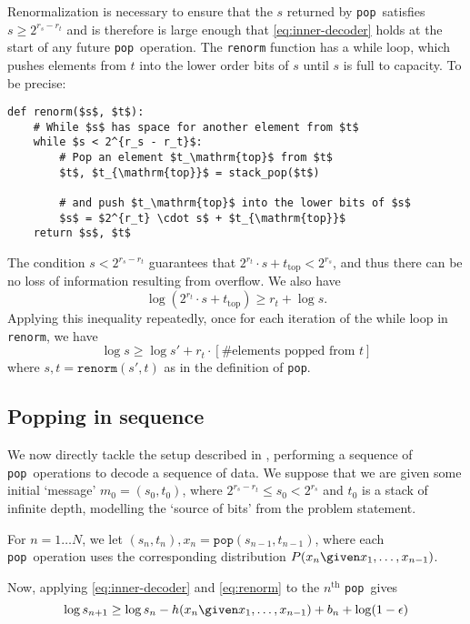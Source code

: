 \documentclass{article}
\newcommand{\pop}{\texttt{pop}}
\begin{document}
Renormalization is necessary to ensure that the \(s\) returned by \pop\
satisfies \(s\geq2^{r_s - r_t}\) and is therefore is large enough that
\cref{eq:inner-decoder} holds at the start of any future \pop\ operation. The
\texttt{renorm} function has a while loop, which pushes elements from \(t\)
into the lower order bits of \(s\) until \(s\) is full to capacity. To be
precise:

\begin{lstlisting}
def renorm($s$, $t$):
    # While $s$ has space for another element from $t$
    while $s < 2^{r_s - r_t}$:
        # Pop an element $t_\mathrm{top}$ from $t$
        $t$, $t_{\mathrm{top}}$ = stack_pop($t$)

        # and push $t_\mathrm{top}$ into the lower bits of $s$
        $s$ = $2^{r_t} \cdot s$ + $t_{\mathrm{top}}$
    return $s$, $t$
\end{lstlisting}

The condition \(s < 2^{r_s - r_t}\) guarantees that \(2^{r_t} \cdot s +
t_{\text{top}} < 2^{r_s}\), and thus there can be no loss of information
resulting from overflow. We also have
\begin{equation}
  \log (2^{r_t} \cdot s + t_\text{top}) \geq r_t + \log s.
\end{equation}
Applying this inequality repeatedly, once for each iteration of the while loop
in \texttt{renorm}, we have
\begin{equation}\label{eq:renorm}
\log s \geq \log s' + r_t\cdot\left[\text{\# elements popped from \(t\)}\right]
\end{equation}
where \(s, t = \texttt{renorm}(s', t)\) as in the definition of \pop.

\subsection{Popping in sequence}
We now directly tackle the setup described in , performing a
sequence of \pop\ operations to decode a sequence of data. We suppose that we
are given some initial `message' \(m_0= (s_0, t_0)\), where \(2^{r_s - r_t}
\leq s_0 < 2^{r_s}\) and \(t_0\) is a stack of infinite depth, modelling the
`source of bits' from the problem statement.

For \(n=1\ldots N\), we let \((s_n, t_n), x_n = \pop(s_{n-1}, t_{n-1})\), where
each \pop\ operation uses the corresponding distribution \(P(x_n\given
x_1,\ldots,x_{n-1})\).

Now, applying \cref{eq:inner-decoder} and \cref{eq:renorm} to the
\(n^\mathrm{th}\) \pop\ gives
\begin{equation}\label{eq:recursion}
  \log s_{n+1} \geq \log s_n - h(x_n\given x_1,\ldots,x_{n-1}) + b_n + \log (1
  - \epsilon)
\end{equation}
\end{document}
